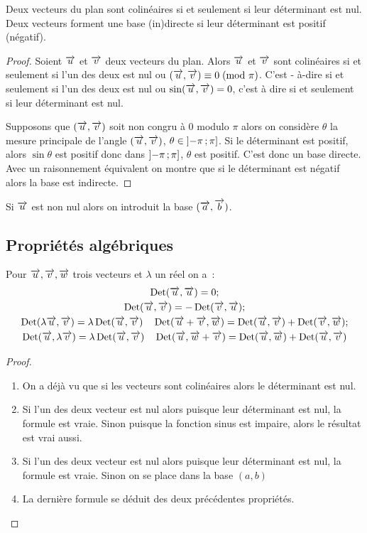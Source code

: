 \begin{prop}
  Deux vecteurs du plan sont colinéaires si et seulement si leur déterminant est
  nul. Deux vecteurs forment une base (in)directe si leur déterminant est
  positif (négatif).
\end{prop}

\begin{proof}
  Soient \(\overrightarrow{u}\) et \(\overrightarrow{v}\) deux vecteurs du plan. Alors \(\overrightarrow{u}\) et \(\overrightarrow{v}\) sont
  colinéaires si et seulement si l'un des deux est nul ou \((\overrightarrow{u} ,
  \overrightarrow{v}) \equiv 0\!\pmod {\pi}\). C'est - à-dire si et seulement si l'un des deux est nul ou \(
  \sin(\overrightarrow{u} , \overrightarrow{v}) = 0\), c'est à dire si et seulement si leur déterminant est
  nul.

  Supposons que \((\overrightarrow{u} , \overrightarrow{v})\) soit non congru à 0 modulo \(\pi\) alors on
  considère \(\theta\) la mesure principale de l'angle \((\overrightarrow{u} , \overrightarrow{v})\), \(\theta
  \in \left] -\pi \, ; {} \pi \right]\). Si le déterminant est positif, alors \(\sin
  \theta\) est positif donc dans \(\left] -\pi \, ; {} \pi  \right]\), \(\theta\) est
  positif. C'est donc un base directe. Avec un raisonnement équivalent on montre
  que si le déterminant est négatif alors la base est indirecte.
\end{proof}

Si \(\overrightarrow{u}\) est non nul alors on introduit la base \((\overrightarrow{a},\overrightarrow{b})\).

\subsection{Propriétés algébriques}

\begin{prop}
  Pour \(\overrightarrow{u}, \overrightarrow{v}, \overrightarrow{w}\) trois vecteurs et \(\lambda\) un réel on a~:
  \begin{gather}
    \operatorname{Det}(\overrightarrow{u} , \overrightarrow{u}) = 0;\\
    \operatorname{Det}(\overrightarrow{u}, \overrightarrow{v}) = -\operatorname{Det}(\overrightarrow{v}, \overrightarrow{u});\\
    \operatorname{Det}( \lambda \overrightarrow{u}, \overrightarrow{v}) = \lambda \operatorname{Det}(\overrightarrow{u}, \overrightarrow{v}) \quad \operatorname{Det}(\overrightarrow{u}+ \overrightarrow{v}, \overrightarrow{w})
    =\operatorname{Det}(\overrightarrow{u}, \overrightarrow{v}) + \operatorname{Det}(\overrightarrow{v}, \overrightarrow{w});\\
    \operatorname{Det}(\overrightarrow{u}, \lambda \overrightarrow{v}) = \lambda \operatorname{Det}(\overrightarrow{u}, \overrightarrow{v}) \quad \operatorname{Det}(\overrightarrow{u}, \overrightarrow{w} + \overrightarrow{v})
    =\operatorname{Det}(\overrightarrow{u}, \overrightarrow{w}) + \operatorname{Det}(\overrightarrow{u}, \overrightarrow{v})
  \end{gather}
\end{prop}

\begin{proof}
  \begin{enumerate}
    \item On a déjà vu que si les vecteurs sont colinéaires alors le déterminant
      est nul.
    \item Si l'un des deux vecteur est nul alors puisque leur déterminant est
      nul, la formule est vraie. Sinon puisque la fonction sinus est impaire,
      alors le résultat est vrai aussi.
    \item Si l'un des deux vecteur est nul alors puisque leur déterminant est
      nul, la formule est vraie. Sinon on se place dans la base \((a, b)\)
    \item La dernière formule se déduit des deux précédentes propriétés.
  \end{enumerate}
\end{proof}

